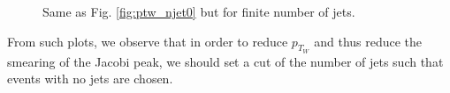 \documentclass[a4paper]{report}
\numberwithin{equation}{section}
\begin{document}
\begin{figure}[htb!]
	\centering
	\quad
	\centering
	\quad
    \centering
	\quad
    \centering
	\quad
	\caption{Same as Fig. \ref{fig:ptw_njet0} but for finite number of jets. }
	\label{fig:ptw_njets}
\end{figure}

From such plots, we observe that in order to reduce $p_{T_W}$ and thus reduce the smearing of the Jacobi peak,
 we should set a cut of the number of jets such that events with no jets are chosen. 
 
\end{document}
